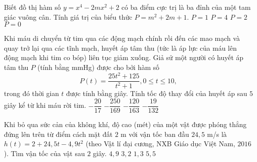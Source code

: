 \begin{ex}%
	Biết đồ thị hàm số $y = x^4 - 2mx^2 + 2$ có ba điểm cực trị là ba đỉnh của một tam giác vuông cân. Tính giá trị của biểu thức $P = m^2 + 2m + 1$.
	\choice
	{$P = 1$}
	{\True $P = 4$}
	{$P = 2$}
	{$P = 0$}
\end{ex}
\begin{ex}%
	Khi máu di chuyển từ tim qua các động mạch chính rồi đến các mao mạch và quay trở lại qua các tĩnh mạch, huyết áp tâm thu (tức là áp lực của máu lên động mạch khi tim co bóp) liên tục giảm xuống. Giả sử một người có huyết áp tâm thu $P$ (tính bằng mmHg) được cho bởi hàm số
	\[
		P(t)=\dfrac{25 t^2+125}{t^2+1}, 0 \leq t \leq 10,
	\]
	trong đó thời gian $t$ được tính bằng giây. Tính tốc độ thay đổi của huyết áp sau $5$ giây kể từ khi máu rời tim.
	\choice
	{$-\dfrac{20}{17}$}
	{\True $-\dfrac{250}{169}$}
	{$-\dfrac{120}{163}$}
	{$-\dfrac{19}{132}$}
\end{ex}
\begin{ex}%
	Khi bỏ qua sức cản của không khí, độ cao (mét) của một vật được phóng thẳng đứng lên trên từ điểm cách mặt đất $2$ m với vận tốc ban đầu $24{,}5$ m/s là $h(t)=2+24{,}5t-4{,}9t^2$ (theo Vật lí đại cương, NXB Giáo dục Việt Nam, $2016$). Tìm vận tốc của vật sau $2$ giây.
	\choice
	{\True $4{,}9$}
	{$3{,}2$}
	{$1{,}3$}
	{$5{,}5$}
\end{ex}

